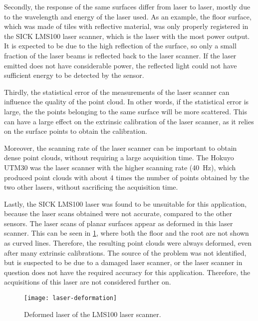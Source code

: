 Secondly, the response of the same surfaces differ from laser to laser, mostly due to the wavelength and energy of the laser used. As an example, the floor surface, which was made of tiles with reflective material, was only properly registered in the SICK LMS100 laser scanner, which is the laser with the most power output. It is expected to be due to the high reflection of the surface, so only a small fraction of the laser beams is reflected back to the laser scanner. If the laser emitted does not have considerable power, the reflected light could not have sufficient energy to be detected by the sensor. 

Thirdly, the statistical error of the measurements of the laser scanner can influence the quality of the point cloud. In other words, if the statistical error is large, the the points belonging to the same surface will be more scattered. This can have a large effect on the extrinsic calibration of the laser scanner, as it relies on the surface points to obtain the calibration.

Moreover, the scanning rate of the laser scanner can be important to obtain dense point clouds, without requiring a large acquisition time. The Hokuyo UTM30 was the laser scanner with the higher scanning rate (\SI{40}{\hertz}), which produced point clouds with about 4 times the number of points obtained by the two other lasers, without sacrificing the acquisition time.

Lastly, the SICK LMS100 laser was found to be unsuitable for this application, because the laser scans obtained were not accurate, compared to the other sensors. The laser scans of planar surfaces appear as deformed in this laser scanner. This can be seen in \cref{figure:deformed-laser}, where both the floor and the root are not shown as curved lines. Therefore, the resulting point clouds were always deformed, even after many extrinsic calibrations. The source of the problem was not identified, but is suspected to be due to a damaged laser scanner, or the laser scanner in question does not have the required accuracy for this application. Therefore, the acquisitions of this laser are not considered further on.

\begin{figure}[h]
    
    \centering
    \texttt{[image: laser-deformation]}

    \caption{Deformed laser of the LMS100 laser scanner.}
    \label{figure:deformed-laser}

\end{figure}


